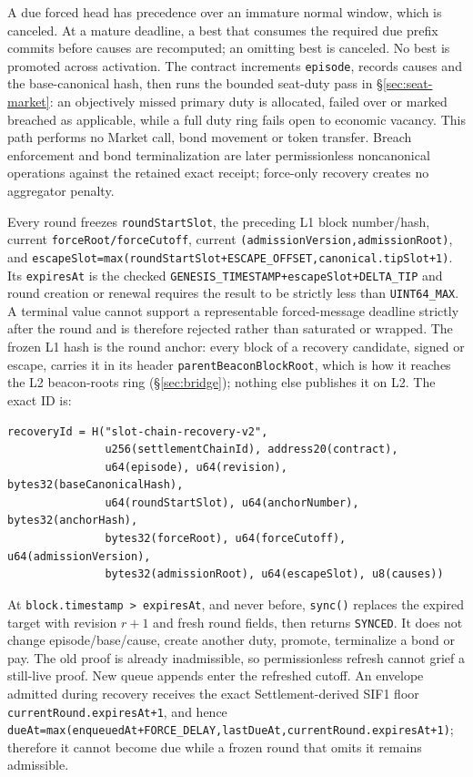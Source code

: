 \documentclass[a4paper,11pt]{article}
\newcommand{\code}[1]{\nolinkurl{#1}}
\begin{document}
A due forced head has precedence over an immature normal window, which is
canceled.  At a mature deadline, a best that consumes the required due prefix
commits before causes are recomputed; an omitting best is canceled.  No best is
promoted across activation.  The contract increments \code{episode}, records
causes and the base-canonical hash, then runs the bounded seat-duty pass in
\S\ref{sec:seat-market}: an objectively missed primary duty is allocated,
failed over or marked breached as applicable, while a full duty ring fails open
to economic vacancy.  This path performs no Market call, bond movement or token
transfer.  Breach enforcement and bond terminalization are later permissionless
noncanonical operations against the retained exact receipt; force-only recovery
creates no aggregator penalty.

Every round freezes \code{roundStartSlot}, the preceding L1 block number/hash,
current \code{forceRoot/forceCutoff}, current
\code{(admissionVersion,admissionRoot)},
and
\code{escapeSlot=max(roundStartSlot+ESCAPE_OFFSET,canonical.tipSlot+1)}.
Its \code{expiresAt} is the checked
\code{GENESIS_TIMESTAMP+escapeSlot+DELTA_TIP} and round creation or renewal
requires the result to be strictly less than \code{UINT64_MAX}.  A terminal
value cannot support a representable forced-message deadline strictly after the
round and is therefore rejected rather than saturated or wrapped.  The frozen
L1 hash is the round anchor: every block of a recovery candidate, signed or
escape, carries it in its header \code{parentBeaconBlockRoot}, which is how it
reaches the L2 beacon-roots ring (\S\ref{sec:bridge}); nothing else
publishes it on L2.  The exact ID is:
\begin{verbatim}
recoveryId = H("slot-chain-recovery-v2",
               u256(settlementChainId), address20(contract),
               u64(episode), u64(revision), bytes32(baseCanonicalHash),
               u64(roundStartSlot), u64(anchorNumber), bytes32(anchorHash),
               bytes32(forceRoot), u64(forceCutoff), u64(admissionVersion),
               bytes32(admissionRoot), u64(escapeSlot), u8(causes))
\end{verbatim}
At \code{block.timestamp > expiresAt}, and never before, \code{sync()} replaces
the expired target with revision $r+1$ and fresh round fields, then returns
\code{SYNCED}.  It does not change episode/base/cause, create another duty,
promote, terminalize a bond or pay.  The old proof is already inadmissible, so permissionless
refresh cannot grief a still-live proof.  New queue appends enter the refreshed
cutoff.  An envelope admitted during recovery receives the exact
Settlement-derived SIF1 floor \code{currentRound.expiresAt+1}, and hence
\code{dueAt=max(enqueuedAt+FORCE_DELAY,lastDueAt,currentRound.expiresAt+1)};
therefore it
cannot become due while a frozen round that omits it remains admissible.
\end{document}
